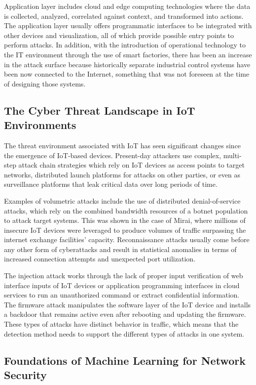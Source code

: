\documentclass[12pt]{article}
\begin{document}
Application layer includes cloud and edge computing technologies where the data is collected, analyzed, correlated against context, and transformed into actions. The application layer usually offers programmatic interfaces to be integrated with other devices and visualization, all of which provide possible entry points to perform attacks. In addition, with the introduction of operational technology to the IT environment through the use of smart factories, there has been an increase in the attack surface because historically separate industrial control systems have been now connected to the Internet, something that was not foreseen at the time of designing those systems.

\subsection{The Cyber Threat Landscape in IoT Environments}

The threat environment associated with IoT has seen significant changes since the emergence of IoT-based devices. Present-day attackers use complex, multi-step attack chain strategies which rely on IoT devices as access points to target networks, distributed launch platforms for attacks on other parties, or even as surveillance platforms that leak critical data over long periods of time.

Examples of volumetric attacks include the use of distributed denial-of-service attacks, which rely on the combined bandwidth resources of a botnet population to attack target systems. This was shown in the case of Mirai, where millions of insecure IoT devices were leveraged to produce volumes of traffic surpassing the internet exchange facilities' capacity. Reconnaissance attacks usually come before any other form of cyberattacks and result in statistical anomalies in terms of increased connection attempts and unexpected port utilization.

The injection attack works through the lack of proper input verification of web interface inputs of IoT devices or application programming interfaces in cloud services to run an unauthorized command or extract confidential information. The firmware attack manipulates the software layer of the IoT device and installs a backdoor that remains active even after rebooting and updating the firmware. These types of attacks have distinct behavior in traffic, which means that the detection method needs to support the different types of attacks in one system.

\subsection{Foundations of Machine Learning for Network Security}
\end{document}
